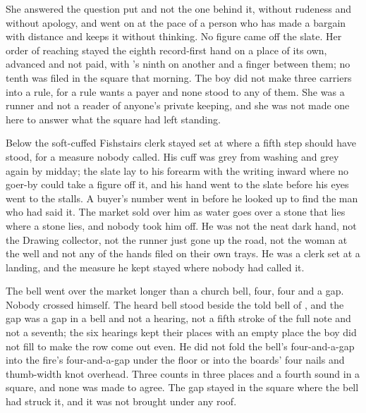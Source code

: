 She answered the question put and not the one behind it, without rudeness and without apology, and went on at the pace of a person who has made a bargain with distance and keeps it without thinking. No figure came off the slate. Her order of reaching stayed the eighth record-first hand on a place of its own, advanced and not paid, with 's ninth on another and a finger between them; no tenth was filed in the square that morning. The boy did not make three carriers into a rule, for a rule wants a payer and none stood to any of them. She was a runner and not a reader of anyone's private keeping, and she was not made one here to answer what the square had left standing.

Below  the soft-cuffed Fishstairs clerk stayed set at  where a fifth step should have stood, for a measure nobody called. His cuff was grey from washing and grey again by midday; the slate lay to his forearm with the writing inward where no goer-by could take a figure off it, and his hand went to the slate before his eyes went to the stalls. A buyer's number went in before he looked up to find the man who had said it. The market sold over him as water goes over a stone that lies where a stone lies, and nobody took him off. He was not the neat dark hand, not the Drawing collector, not the runner just gone up the road, not the woman at the well and not any of the hands filed on their own trays. He was a clerk set at a landing, and the measure he kept stayed where nobody had called it.

The bell went over the market longer than a church bell, four, four and a gap. Nobody crossed himself. The heard bell stood beside the told bell of , and the gap was a gap in a bell and not a hearing, not a fifth stroke of the full note and not a seventh; the six hearings kept their places with an empty place the boy did not fill to make the row come out even. He did not fold the bell's four-and-a-gap into the fire's four-and-a-gap under the floor or into the boards' four nails and thumb-width knot overhead. Three counts in three places and a fourth sound in a square, and none was made to agree. The gap stayed in the square where the bell had struck it, and it was not brought under any roof.

